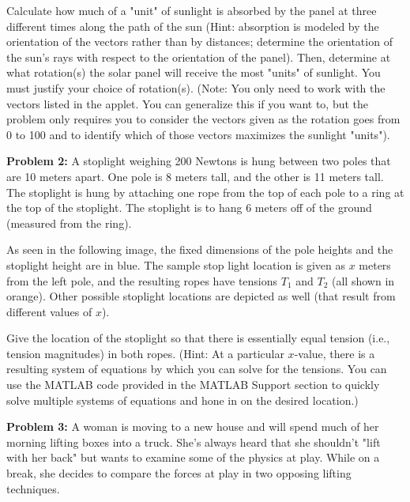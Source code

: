 \documentclass{ximera}
\begin{document}
\begin{center}
\end{center}

Calculate how much of a "unit" of sunlight is absorbed by the panel at three different times along the path of the sun (Hint: absorption is modeled by the orientation of the vectors rather than by distances; determine the orientation of the sun's rays with respect to the orientation of the panel). Then, determine at what rotation(s) the solar panel will receive the most "units" of sunlight. You must justify your choice of rotation(s). (Note: You only need to work with the vectors listed in the applet. You can generalize this if you want to, but the problem only requires you to consider the vectors given as the rotation goes from 0 to 100 and to identify which of those vectors maximizes the sunlight "units").

\textbf{Problem 2:} A stoplight weighing 200 Newtons is hung between two poles that are 10 meters apart. One pole is 8 meters tall, and the other is 11 meters tall. The stoplight is hung by attaching one rope from the top of each pole to a ring at the top of the stoplight. The stoplight is to hang 6 meters off of the ground (measured from the ring).

As seen in the following image, the fixed dimensions of the pole heights and the stoplight height are in blue. The sample stop light location is given as $x$ meters from the left pole, and the resulting ropes have tensions $T_1$ and $T_2$ (all shown in orange). Other possible stoplight locations are depicted as well (that result from different values of $x$).


Give the location of the stoplight so that there is essentially equal tension (i.e., tension magnitudes) in both ropes. (Hint: At a particular $x$-value, there is a resulting system of equations by which you can solve for the tensions. You can use the MATLAB code provided in the MATLAB Support section to quickly solve multiple systems of equations and hone in on the desired location.)

\textbf{Problem 3:} A woman is moving to a new house and will spend much of her morning lifting boxes into a truck. She's always heard that she shouldn't "lift with her back" but wants to examine some of the physics at play. While on a break, she decides to compare the forces at play in two opposing lifting techniques.
\end{document}
